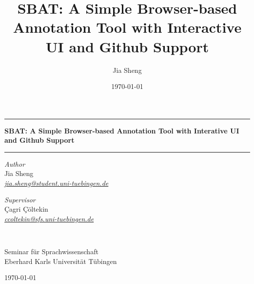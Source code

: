 \documentclass[a4paper]{article}
\title{SBAT: A Simple Browser-based Annotation Tool with Interactive UI and Github Support}
\author{Jia Sheng}
\date{\today}
\begin{document}
\begin{titlepage}
\begin{center}

\hrule
\vspace{0.6cm}
{\bfseries\LARGE
SBAT: A Simple Browser-based Annotation Tool with Interative UI and Github Support
}\\[1cm]
\hrule
\vspace*{.05\textheight}
 
\begin{minipage}[t]{0.49\textwidth}
\begin{flushleft} 
{\large
\textit{Author}\\
Jia Sheng}\\
\href{mailto:jia.sheng@student.uni-tuebingen.de}{\textit{jia.sheng@student.uni-tuebingen.de}}\\
\end{flushleft}
\end{minipage}
\begin{minipage}[t]{0.49\textwidth}
\begin{flushright}
{\large
\textit{Supervisor}\\
Çagri Çöltekin}\\
\href{mailto:ccoltekin@sfs.uni-tuebingen.de}{\textit{ccoltekin@sfs.uni-tuebingen.de}}\\
\end{flushright}
\end{minipage}\\

\vfill

\vspace*{.1\textheight}

{\large Seminar für Sprachwissenschaft\\
Eberhard Karls Universität Tübingen

\vspace{1em}
\today}
\end{center}
\end{titlepage}


% 

\newpage
\newpage

\end{document}
